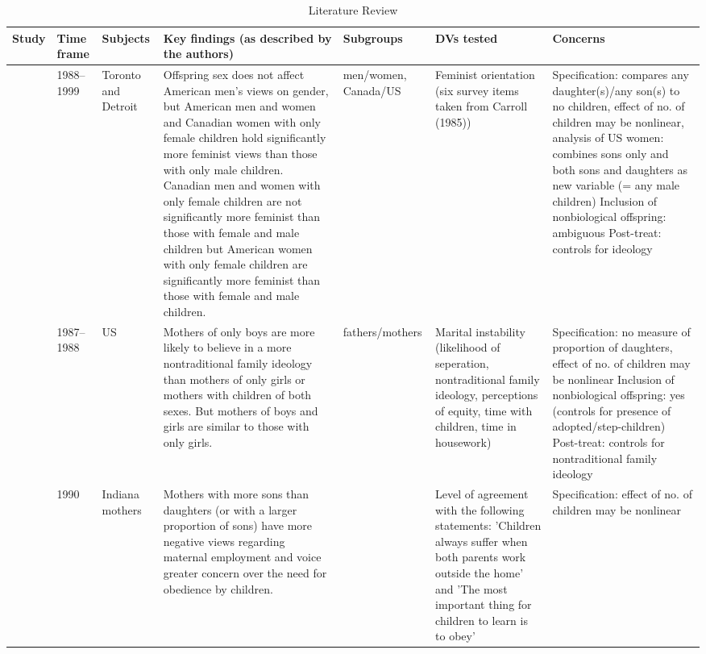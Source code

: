 \begingroup\tiny
\begin{longtable}{p{}p{}p{}p{}p{}p{}p{}}
\caption{Literature Review} \\ 
  \toprule
Study & Time frame & Subjects & Key findings (as described by the authors) & Subgroups & DVs tested & Concerns \\ 
  \midrule
\cite{warner1991does} & 1988--1999 & Toronto and Detroit & Offspring sex does not affect American men's views on gender, but American men and women and Canadian women with only female children hold significantly more feminist views than those with only male children. Canadian men and women with only female children are not significantly more feminist than those with female and male children but American women with only female children are significantly more feminist than those with female and male children. & men/women, Canada/US
 & Feminist orientation (six survey items taken from Carroll (1985)) & Specification: compares any daughter(s)/any son(s) to no children, effect of no. of children may be nonlinear, analysis of US women: combines sons only and both sons and daughters as new variable (= any male children)
Inclusion of nonbiological offspring: ambiguous
Post-treat: controls for ideology \\ 
   \midrule
\cite{katzev1994girls} & 1987--1988 & US & Mothers of only boys are more likely to believe in a more nontraditional family ideology than mothers of only girls or mothers with children of both sexes. But mothers of boys and girls are similar to those with only girls. & fathers/mothers & Marital instability (likelihood of seperation, nontraditional family ideology, perceptions of equity, time with children, time in housework) & Specification: no measure of proportion of daughters, effect of no. of children may be nonlinear
Inclusion of nonbiological offspring: yes (controls for presence of adopted/step-children)
Post-treat: controls for nontraditional family ideology \\ 
   \midrule
\cite{downey1994sons} & 1990 & Indiana mothers & Mothers with more sons than daughters (or with a larger proportion of sons) have more negative views regarding maternal employment and voice greater concern over the need for obedience by children. &  & Level of agreement with the following statements: 'Children always suffer when both parents work outside the home' and 'The most important thing for children to learn is to obey' & Specification: effect of no. of children may be nonlinear

\end{longtable}

